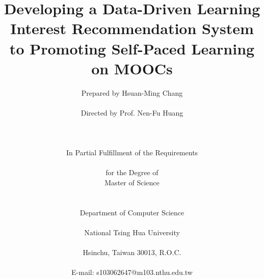 \title{Developing a Data-Driven Learning Interest Recommendation System to Promoting Self-Paced Learning on MOOCs}
\author{
    Prepared by Hsuan-Ming Chang\\ \\
    Directed by Prof. Nen-Fu Huang\\ \\ \\ \\
    In Partial Fulfillment of the Requirements\\ \\
    for the Degree of\\
    Master of Science \\ \\ \\
    Department of Computer Science\\ \\
    National Tsing Hua University \\ \\
    Hsinchu, Taiwan 30013, R.O.C.\\ \\
    E-mail: s103062647@m103.nthu.edu.tw\\
}
